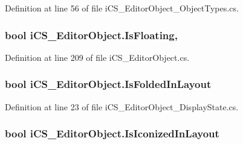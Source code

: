Definition at line 56 of file i\+C\+S\+\_\+\+Editor\+Object\+\_\+\+Object\+Types.\+cs.

\hypertarget{classi_c_s___editor_object_a1ad80a4047294a71db990e454419f2f2}{
\subsubsection[{Is\+Floating}]{\setlength{\rightskip}{0pt plus 5cm}bool i\+C\+S\+\_\+\+Editor\+Object.\+Is\+Floating\hspace{0.3cm}{\ttfamily [get]}, {\ttfamily [set]}}}\label{classi_c_s___editor_object_a1ad80a4047294a71db990e454419f2f2}


Definition at line 209 of file i\+C\+S\+\_\+\+Editor\+Object.\+cs.

\hypertarget{classi_c_s___editor_object_a421d2933709f793021f1ba09ec7ddb3f}{
\subsubsection[{Is\+Folded\+In\+Layout}]{\setlength{\rightskip}{0pt plus 5cm}bool i\+C\+S\+\_\+\+Editor\+Object.\+Is\+Folded\+In\+Layout\hspace{0.3cm}{\ttfamily [get]}}}\label{classi_c_s___editor_object_a421d2933709f793021f1ba09ec7ddb3f}


Definition at line 23 of file i\+C\+S\+\_\+\+Editor\+Object\+\_\+\+Display\+State.\+cs.

\hypertarget{classi_c_s___editor_object_a4b2662a78bdcdf59248325b8db290d30}{
\subsubsection[{Is\+Iconized\+In\+Layout}]{\setlength{\rightskip}{0pt plus 5cm}bool i\+C\+S\+\_\+\+Editor\+Object.\+Is\+Iconized\+In\+Layout\hspace{0.3cm}{\ttfamily [get]}}}\label{classi_c_s___editor_object_a4b2662a78bdcdf59248325b8db290d30}


